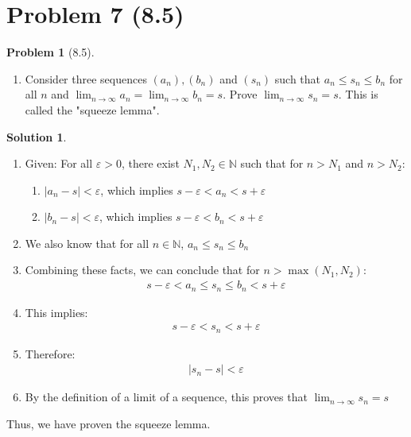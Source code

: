 \documentclass[12pt]{article}
\theoremstyle{definition} %
\newtheorem{solution}{Solution}
\newtheorem{problem}{Problem}
\theoremstyle{plain} %
\begin{document}
\section*{Problem 7 (8.5)}
\begin{problem}[8.5]
 \begin{enumerate}
    \item Consider three sequences $(a_{n}), (b_n)$ and $(s_{n})$ such that $a_{n}\leq s_{n}\leq b_{n}$ for all $n$ and $\lim_{ n \to \infty }a_{n}=\lim_{ n \to \infty }b_{n}=s$. Prove $\lim_{ n \to \infty }s_{n}=s$. This is called the "squeeze lemma".
\end{enumerate}
  
\end{problem}
\begin{solution}
     \begin{enumerate}
        \item Given: For all $\varepsilon > 0$, there exist $N_1, N_2 \in \mathbb{N}$ such that for $n > N_1$ and $n > N_2$:
        \begin{enumerate}
            \item $|a_n - s| < \varepsilon$, which implies $s - \varepsilon < a_n < s + \varepsilon$
            \item $|b_n - s| < \varepsilon$, which implies $s - \varepsilon < b_n < s + \varepsilon$
        \end{enumerate}
        \item We also know that for all $n \in \mathbb{N}$, $a_n \leq s_n \leq b_n$
        \item Combining these facts, we can conclude that for $n > \max(N_1, N_2)$:
        \begin{align}
        s - \varepsilon < a_n \leq s_n \leq b_n < s + \varepsilon
        \end{align}
        \item This implies:
        \begin{align}
        s - \varepsilon < s_n < s + \varepsilon
        \end{align}
        \item Therefore:
        \begin{align}
        |s_n - s| < \varepsilon
        \end{align}
        \item By the definition of a limit of a sequence, this proves that $\lim_{n \to \infty} s_n = s$
    \end{enumerate}
    Thus, we have proven the squeeze lemma. 


\end{solution}
\end{document}
